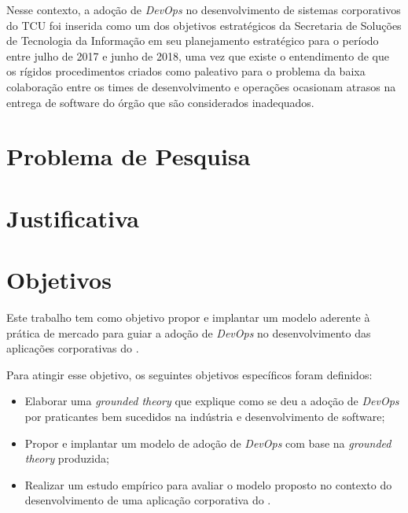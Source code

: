 Nesse contexto, a adoção de \textit{DevOps} no desenvolvimento de sistemas
corporativos do \acrfull{TCU} foi inserida como um dos objetivos estratégicos da
Secretaria de Soluções de Tecnologia da Informação em seu planejamento estratégico
para o período entre julho de 2017 e junho de 2018, uma vez que existe o
entendimento de que os rígidos procedimentos criados como paleativo para o
problema da baixa colaboração entre os times de desenvolvimento e operações
ocasionam atrasos na entrega de software do órgão que são considerados inadequados.

\section{Problema de Pesquisa}%

\section{Justificativa}%


\section{Objetivos}
Este trabalho tem como objetivo propor e implantar um modelo aderente à prática
de mercado para guiar a adoção de \textit{DevOps} no desenvolvimento das
aplicações corporativas do .

Para atingir esse objetivo, os seguintes objetivos específicos foram definidos:

\begin{itemize}
\item Elaborar uma \textit{grounded theory} que explique como se deu a adoção
de \textit{DevOps} por praticantes bem sucedidos na indústria e desenvolvimento
de software;
\item Propor e implantar um modelo de adoção de \textit{DevOps} com base na
\textit{grounded theory} produzida;
\item Realizar um estudo empírico para avaliar o modelo proposto no contexto
do desenvolvimento de uma aplicação corporativa do .
\end{itemize}

